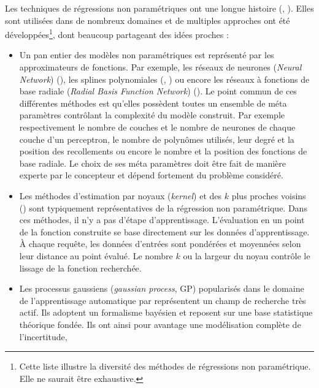 Les techniques de régressions non paramétriques ont une longue histoire 
(\cite{hardle_applied_1990}, \cite{yatchew_nonparametric_1998}).
Elles sont utilisées dans de nombreux domaines et de multiples 
approches ont été développées\footnote{Cette liste illustre la diversité des méthodes 
de régressions non paramétrique. Elle ne saurait être exhaustive.}, 
dont beaucoup partageant des idées proches :
\begin{itemize}
    \item Un pan entier des modèles non paramétriques est représenté par 
        les approximateurs de fonctions.
        Par exemple, les réseaux de neurones (\textit{Neural Network}) (\cite{rojas_neural_2013}), 
        les splines polynomiales (\cite{durrleman_flexible_1989}, \cite{eubank_nonparametric_1999})
        ou encore les réseaux à fonctions de base radiale 
        (\textit{Radial Basis Function Network}) (\cite{park_universal_1991}).
        Le point commun de ces différentes méthodes est qu'elles possèdent toutes un ensemble 
        de méta paramètres contrôlant la complexité du modèle construit.
        Par exemple respectivement le nombre de couches et le nombre de neurones de chaque couche d'un perceptron, 
        le nombre de polynômes utilisés, leur degré et la position des recollements ou encore le nombre 
        et la position des fonctions de base radiale.
        Le choix de ses méta paramètres doit être fait de manière experte par le concepteur et
        dépend fortement du problème considéré.
    \item Les méthodes d'estimation par noyaux (\textit{kernel}) et des $k$ plus 
        proches voisins (\cite{ltman_introduction_1992}) sont typiquement représentatives
        de la régression non paramétrique. Dans ces méthodes, il n'y a pas d'étape d'apprentissage.
        L'évaluation en un point de la fonction construite se base directement sur les 
        données d'apprentissage.
        À chaque requête, les données d'entrées sont pondérées et moyennées selon leur distance 
        au point évalué.
        Le nombre $k$ ou la largeur du noyau contrôle le lissage de la fonction recherchée.
    \item Les processus gaussiens (\textit{gaussian process}, GP) popularisés dans le domaine 
        de l'apprentissage automatique par \cite{rasmussen_gaussian_2006} représentent un champ 
        de recherche très actif. Ils adoptent un formalisme bayésien et reposent sur
        une base statistique théorique fondée. 
        Ils ont ainsi pour avantage une modélisation complète de l'incertitude, 

\end{itemize}
